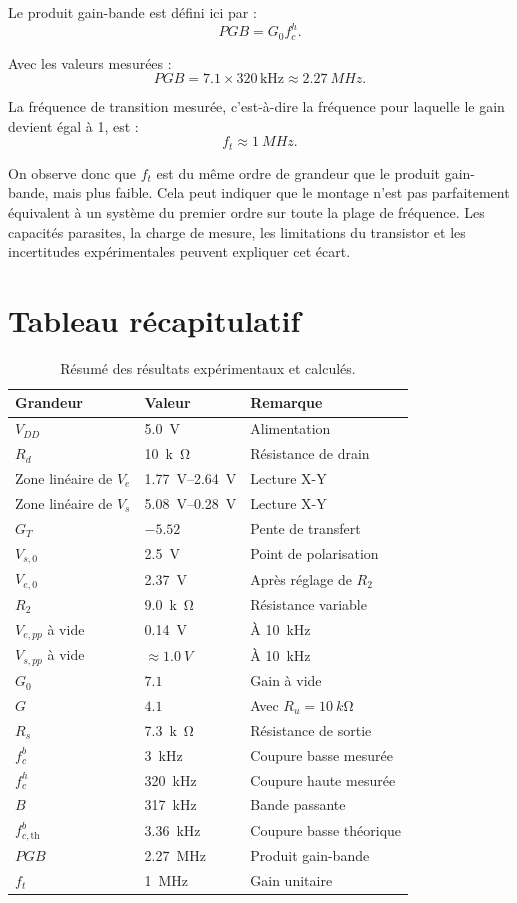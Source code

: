 \documentclass[11pt,a4paper]{article}
\begin{document}
Le produit gain-bande est défini ici par :
\[
PGB=G_0 f_c^h.
\]

Avec les valeurs mesurées :
\[
PGB=7.1\times 320\,\mathrm{kHz}
\approx \SI{2.27}{MHz}.
\]

La fréquence de transition mesurée, c'est-à-dire la fréquence pour laquelle le gain devient égal à 1, est :
\[
f_t\approx \SI{1}{MHz}.
\]

On observe donc que $f_t$ est du même ordre de grandeur que le produit gain-bande, mais plus faible. Cela peut indiquer que le montage n'est pas parfaitement équivalent à un système du premier ordre sur toute la plage de fréquence. Les capacités parasites, la charge de mesure, les limitations du transistor et les incertitudes expérimentales peuvent expliquer cet écart.

\section{Tableau récapitulatif}

\begin{table}[H]
\centering
\begin{tabular}{lll}
\toprule
Grandeur & Valeur & Remarque \\
\midrule
$V_{DD}$ & \SI{5.0}{V} & Alimentation \\
$R_d$ & \SI{10}{k\ohm} & Résistance de drain \\
Zone linéaire de $V_e$ & \SI{1.77}{V}--\SI{2.64}{V} & Lecture X-Y \\
Zone linéaire de $V_s$ & \SI{5.08}{V}--\SI{0.28}{V} & Lecture X-Y \\
$G_T$ & $-5.52$ & Pente de transfert \\
$V_{s,0}$ & \SI{2.5}{V} & Point de polarisation \\
$V_{e,0}$ & \SI{2.37}{V} & Après réglage de $R_2$ \\
$R_2$ & \SI{9.0}{k\ohm} & Résistance variable \\
$V_{e,pp}$ à vide & \SI{0.14}{V} & À \SI{10}{kHz} \\
$V_{s,pp}$ à vide & $\approx\SI{1.0}{V}$ & À \SI{10}{kHz} \\
$G_0$ & $7.1$ & Gain à vide \\
$G$ & $4.1$ & Avec $R_u=\SI{10}{k\ohm}$ \\
$R_s$ & \SI{7.3}{k\ohm} & Résistance de sortie \\
$f_c^b$ & \SI{3}{kHz} & Coupure basse mesurée \\
$f_c^h$ & \SI{320}{kHz} & Coupure haute mesurée \\
$B$ & \SI{317}{kHz} & Bande passante \\
$f_{c,\mathrm{th}}^b$ & \SI{3.36}{kHz} & Coupure basse théorique \\
$PGB$ & \SI{2.27}{MHz} & Produit gain-bande \\
$f_t$ & \SI{1}{MHz} & Gain unitaire \\
\bottomrule
\end{tabular}
\caption{Résumé des résultats expérimentaux et calculés.}
\end{table}
\end{document}
